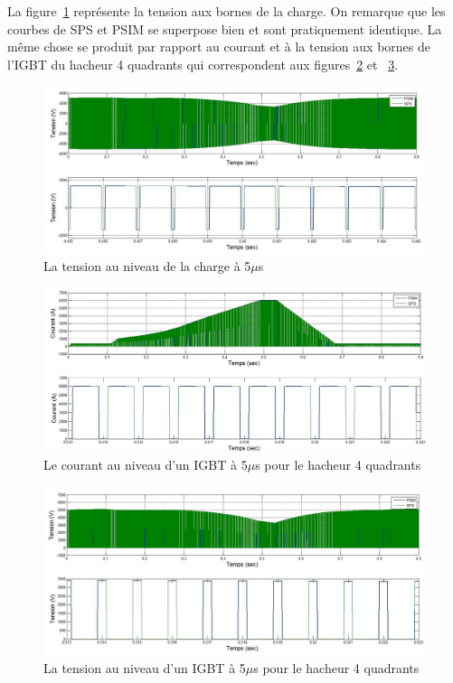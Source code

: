 \documentclass[11pt,letterpaper,final]{report}
\begin{document}
La figure~\ref{AF_HA_CHV5} représente la tension aux bornes de la charge. On remarque que les courbes de SPS et PSIM se superpose bien et sont pratiquement identique. La même chose se produit par rapport au courant et à la tension aux bornes de l'IGBT du hacheur 4 quadrants qui correspondent aux figures~\ref{AF_HA_HAA5} et ~\ref{AF_HA_HAV5}.

\begin{figure}[htb]
\centering
\includegraphics[scale=0.5]{Fig/Hach_AFE/5u/hach_ten_ch.jpg}
\caption{La tension au niveau de la charge à 5$\mu$s}
\label{AF_HA_CHV5}
\end{figure}



\begin{figure}[htb]
\centering
\includegraphics[scale=0.5]{Fig/Hach_AFE/5u/IGBT_cou_hach.jpg}
\caption{Le courant au niveau d'un IGBT à 5$\mu$s pour le hacheur 4 quadrants}
\label{AF_HA_HAA5}
\end{figure}

\begin{figure}[htb]
\centering
\includegraphics[scale=0.5]{Fig/Hach_AFE/5u/IGBT_ten_hach.jpg}
\caption{La tension au niveau d'un IGBT à 5$\mu$s pour le hacheur 4 quadrants}
\label{AF_HA_HAV5}
\end{figure}
\end{document}
